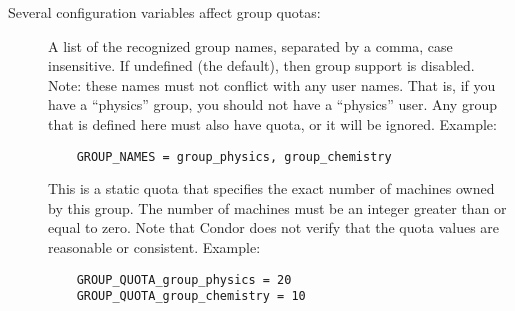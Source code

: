 Several configuration variables affect group quotas:

\begin{description}
  
\item[]
    A list of the recognized group names, separated by a comma,
	case insensitive.  If undefined (the default), then group support
	is disabled.  Note: these names must not conflict with any
	user names. That is, if you have a ``physics'' group, you should
    not have a ``physics'' user.  Any group that is defined here must
    also have quota, or it will be ignored. Example: 
\begin{verbatim}
    GROUP_NAMES = group_physics, group_chemistry 
\end{verbatim}

\item[]
    This is a static quota that specifies the exact number of machines
	owned by this group.  The number of machines must be an integer
	greater than or equal to zero. Note that Condor does not verify
	that the quota values are reasonable or consistent.  
    Example:

\begin{verbatim}
    GROUP_QUOTA_group_physics = 20
    GROUP_QUOTA_group_chemistry = 10
\end{verbatim}

%
%



\end{description}

